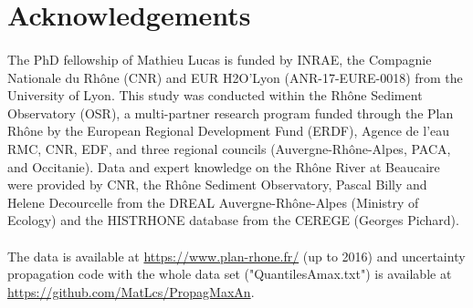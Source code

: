 \section{Acknowledgements}
\paragraph{}
The PhD fellowship of Mathieu Lucas is funded by INRAE, the Compagnie Nationale du Rhône (CNR) and EUR H2O’Lyon (ANR-17-EURE-0018) from the University of Lyon. This study was conducted within the Rhône Sediment Observatory (OSR), a multi-partner research program funded through the Plan Rhône by the European Regional Development Fund (ERDF), Agence de l'eau RMC, CNR, EDF, and three regional councils (Auvergne-Rhône-Alpes, PACA, and Occitanie). Data and expert knowledge on the Rhône River at Beaucaire were provided by CNR, the Rhône Sediment Observatory, Pascal Billy and Helene Decourcelle from the DREAL Auvergne-Rhône-Alpes (Ministry of Ecology) and the HISTRHONE database from the CEREGE (Georges Pichard).
\paragraph{} The data is available at \href{https://www.plan-rhone.fr/publications-131/actualisation-de-lhydrologie-des-crues-du-rhone-1865.html?cHash=5628938abe287dc9ca390dad7373ae0e}{https://www.plan-rhone.fr/} (up to 2016) and uncertainty propagation code with the whole data set ("QuantilesAmax.txt") is available at \url{https://github.com/MatLcs/PropagMaxAn}.

\newpage